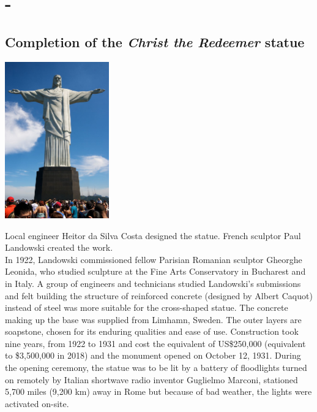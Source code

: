 \documentclass[11pt]{report}
\begin{document}
\section{-}
\subsection{Completion of the \textit{Christ the Redeemer} statue}
\vspace{2mm}\begin{center}\includegraphics[width=4.5cm]{./img/christStatue.jpg}\end{center}
Local engineer Heitor da Silva Costa designed the statue. French sculptor Paul Landowski created the work.\\ \indent In 1922, Landowski commissioned fellow Parisian Romanian sculptor Gheorghe Leonida, who studied sculpture at the Fine Arts Conservatory in Bucharest and in Italy.
A group of engineers and technicians studied Landowski's submissions and felt building the structure of reinforced concrete (designed by Albert Caquot) instead of steel was more suitable for the cross-shaped statue. The concrete making up the base was supplied from Limhamn, Sweden. The outer layers are soapstone, chosen for its enduring qualities and ease of use. Construction took nine years, from 1922 to 1931 and cost the equivalent of US\$250,000 (equivalent to \$3,500,000 in 2018) and the monument opened on October 12, 1931. During the opening ceremony, the statue was to be lit by a battery of floodlights turned on remotely by Italian shortwave radio inventor Guglielmo Marconi, stationed 5,700 miles (9,200 km) away in Rome but because of bad weather, the lights were activated on-site.
\end{document}
